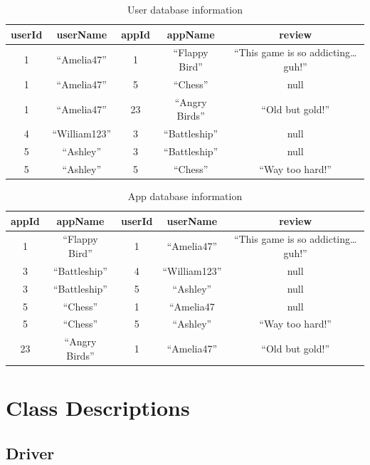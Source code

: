 \documentclass{article}
\begin{document}
\begin{table}[ht!]
    \centering
    \noindent\begin{tabular}{*{5}{c}}
        \toprule
        userId & userName & appId & appName & review \\
        \midrule
        1 & ``Amelia47'' & 1 & ``Flappy Bird'' & ``This game is so addicting\ldots guh!'' \\
        1 & ``Amelia47'' & 5 & ``Chess'' & null \\
        1 & ``Amelia47'' & 23 & ``Angry Birds'' & ``Old but gold!'' \\
        4 & ``William123'' & 3 & ``Battleship'' & null \\
        5 & ``Ashley'' & 3 & ``Battleship'' & null \\
        5 & ``Ashley'' & 5 & ``Chess'' & ``Way too hard!'' \\
        \bottomrule
    \end{tabular}
    \caption{User database information\label{table:user-showall}}
\end{table}

\begin{table}[ht!]
    \centering
    \noindent\begin{tabular}{*{5}{c}}
        \toprule
        appId & appName & userId & userName & review \\
        \midrule
        1 & ``Flappy Bird'' & 1 & ``Amelia47'' & ``This game is so addicting\ldots guh!'' \\
        3 & ``Battleship'' & 4 & ``William123'' & null \\
        3 & ``Battleship'' & 5 & ``Ashley'' & null \\
        5 & ``Chess'' & 1 & ``Amelia47 & null \\
        5 & ``Chess'' & 5 & ``Ashley'' & ``Way too hard!'' \\
        23 & ``Angry Birds'' & 1 & ``Amelia47'' & ``Old but gold!'' \\
        \bottomrule
    \end{tabular}
    \caption{App database information\label{table:app-showall}}
\end{table}

\section{Class Descriptions}
\subsection{Driver}
\end{document}
